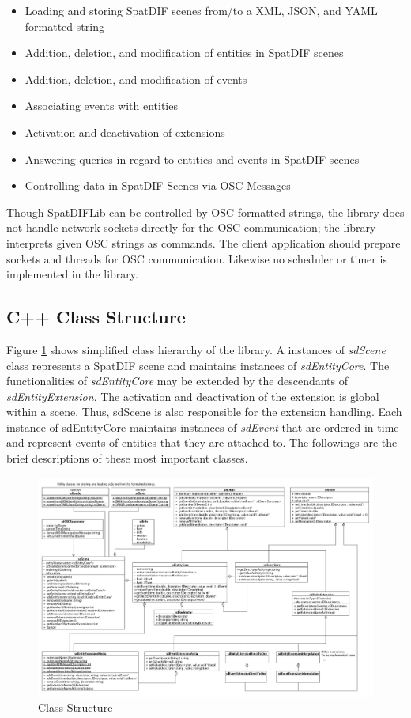 \documentclass[a4paper]{article}
\begin{document}
\begin{itemize}
\item Loading and storing SpatDIF scenes from/to a XML, JSON, and YAML formatted string
\item Addition, deletion, and modification of entities in SpatDIF scenes
\item Addition, deletion, and modification of events
\item Associating events with entities
\item Activation and deactivation of extensions
\item Answering queries in regard to entities and events in SpatDIF scenes
\item Controlling data in SpatDIF Scenes via OSC Messages
\end{itemize}

Though SpatDIFLib can be controlled by OSC formatted strings, the library does not handle network sockets directly for the OSC communication; the library interprets given OSC strings as commands. The client application should prepare sockets and threads for OSC communication. Likewise no scheduler or timer is implemented in the library. 
  
\subsection{C++ Class Structure}
Figure \ref{fig:class_structure} shows simplified class hierarchy of the library. 
A instances of {\it sdScene} class represents a SpatDIF scene and maintains instances of {\it sdEntityCore}. The functionalities of {\it sdEntityCore} may be extended by the descendants of {\it sdEntityExtension}. The activation and deactivation of the extension is global within a scene. Thus, sdScene is also responsible for the extension handling. Each instance of
sdEntityCore maintains instances of {\it sdEvent} that are ordered in time and represent events of entities that they are attached to. The followings are the brief descriptions of these most important classes.

\begin{figure}[t]
\centerline{
	\includegraphics[width= 17.5cm]{classes.pdf}}
\caption{Class Structure}
\label{fig:class_structure}
\end{figure}
\end{document}
